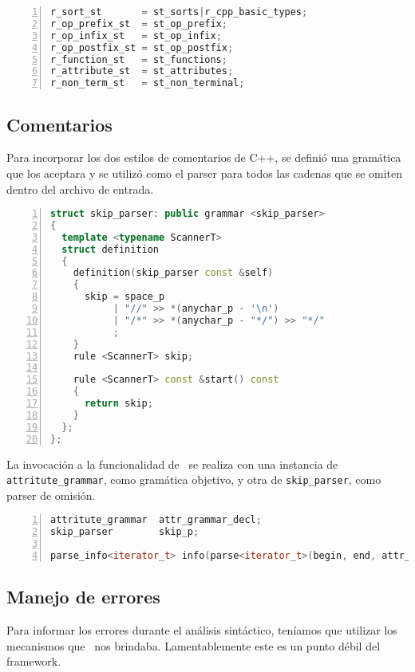 \begin{lstlisting}[language=C++, basicstyle=\scriptsize, numbers=left, numbersep=5pt, numberstyle=\tiny]
r_sort_st       = st_sorts|r_cpp_basic_types;
r_op_prefix_st  = st_op_prefix;
r_op_infix_st   = st_op_infix;
r_op_postfix_st = st_op_postfix;
r_function_st   = st_functions;
r_attribute_st  = st_attributes;
r_non_term_st   = st_non_terminal;
\end{lstlisting}

\subsection{Comentarios}

Para incorporar los dos estilos de comentarios de C++, se definió una gramática que los aceptara y se utilizó como el parser para todos las cadenas que se omiten dentro del archivo de entrada.

\begin{lstlisting}[language=C++, basicstyle=\scriptsize, numbers=left, numbersep=5pt, numberstyle=\tiny]
struct skip_parser: public grammar <skip_parser>
{
  template <typename ScannerT>
  struct definition
  {
    definition(skip_parser const &self)
    {
      skip = space_p
           | "//" >> *(anychar_p - '\n')
           | "/*" >> *(anychar_p - "*/") >> "*/"
           ;
    }
    rule <ScannerT> skip;

    rule <ScannerT> const &start() const
    {
      return skip;
    }
  };
};
\end{lstlisting}

La invocación a la funcionalidad de \spirit\ se realiza con una instancia de \texttt{attritute\_grammar}, como gramática objetivo, y otra de \texttt{skip\_parser}, como parser de omisión.

\begin{lstlisting}[language=C++, basicstyle=\scriptsize, numbers=left, numbersep=5pt, numberstyle=\tiny]
attritute_grammar  attr_grammar_decl;
skip_parser        skip_p;

parse_info<iterator_t> info(parse<iterator_t>(begin, end, attr_grammar_decl, skip_p));
\end{lstlisting}

\subsection{Manejo de errores}

Para informar los errores durante el análisis sintáctico, teníamos que utilizar los mecanismos que \spirit\ nos brindaba. Lamentablemente este es un punto débil del framework.

